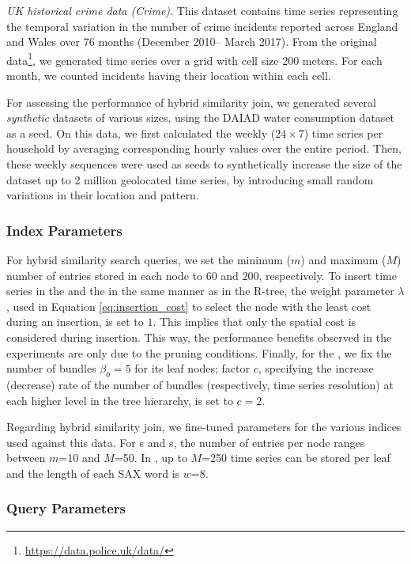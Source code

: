 \emph{UK historical crime data (Crime)}. This dataset contains time series representing the temporal variation in the number of crime incidents reported across England and Wales over 76 months (December 2010-- March 2017). From the original data\footnote{\url{https://data.police.uk/data/}}, we generated time series over a grid with cell size 200 meters. For each month, we counted incidents having their location within each cell.

For assessing the performance of hybrid similarity join, we generated several {\em synthetic} datasets of various sizes, using the DAIAD water consumption dataset as a seed. On this data, we first calculated the weekly  ($24 \times 7$) time series per household by averaging corresponding hourly values over the entire period. Then, these weekly sequences were used as seeds to synthetically increase the size of the dataset up to 2 million geolocated time series, by introducing small random variations in their location and pattern.

\subsubsection{Index Parameters} 

For hybrid similarity search queries, we set the minimum ($m$) and maximum ($M$) number of entries stored in each node to $60$ and $200$, respectively. To insert time series in the \tsr and the \btsr in the same manner as in the R-tree, the weight parameter $\lambda$, used in Equation \ref{eq:insertion_cost} to select the node with the least cost during an insertion, is set to $1$. This implies that only the spatial cost is considered during insertion. This way, the performance benefits observed in the experiments are only due to the pruning conditions. Finally, for the \btsr, we fix the number of bundles $\beta_0 = 5$ for its leaf nodes; factor $c$, specifying the increase (decrease) rate of the number of bundles (respectively, time series resolution) at each higher level in the tree hierarchy, is set to $c=2$.

Regarding hybrid similarity join, we fine-tuned parameters for the various indices used against this data. For {\btsr}s and {\rtree}s, the number of entries per node ranges between $m$=10 and $M$=50. In \isax, up to $M$=250 time series can be stored per leaf and the length of each SAX word is $w$=8.

\subsubsection{Query Parameters}

